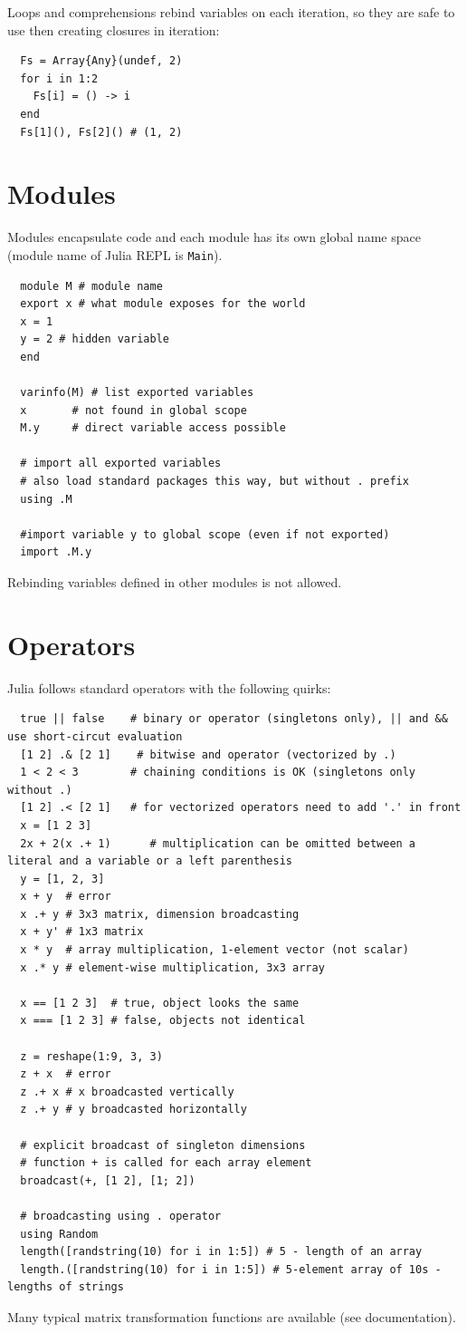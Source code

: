 \documentclass[10pt,a4paper]{article}
\begin{document}
Loops and comprehensions rebind variables on each iteration, so they are safe to use then creating closures in iteration:
\begin{lstlisting}
  Fs = Array{Any}(undef, 2)
  for i in 1:2
    Fs[i] = () -> i
  end
  Fs[1](), Fs[2]() # (1, 2)
\end{lstlisting}

\section{Modules}
Modules encapsulate code and each module has its own global name space (module name of Julia REPL is \lstinline|Main|).
\begin{lstlisting}
  module M # module name
  export x # what module exposes for the world
  x = 1
  y = 2 # hidden variable
  end

  varinfo(M) # list exported variables
  x       # not found in global scope
  M.y     # direct variable access possible

  # import all exported variables
  # also load standard packages this way, but without . prefix
  using .M

  #import variable y to global scope (even if not exported)
  import .M.y
\end{lstlisting}
Rebinding variables defined in other modules is not allowed.

\section{Operators}
Julia follows standard operators with the following quirks:
\begin{lstlisting}
  true || false    # binary or operator (singletons only), || and && use short-circut evaluation
  [1 2] .& [2 1]    # bitwise and operator (vectorized by .)
  1 < 2 < 3        # chaining conditions is OK (singletons only without .)
  [1 2] .< [2 1]   # for vectorized operators need to add '.' in front
  x = [1 2 3]
  2x + 2(x .+ 1)      # multiplication can be omitted between a literal and a variable or a left parenthesis
  y = [1, 2, 3]
  x + y  # error
  x .+ y # 3x3 matrix, dimension broadcasting
  x + y' # 1x3 matrix
  x * y  # array multiplication, 1-element vector (not scalar)
  x .* y # element-wise multiplication, 3x3 array

  x == [1 2 3]  # true, object looks the same
  x === [1 2 3] # false, objects not identical

  z = reshape(1:9, 3, 3)
  z + x  # error
  z .+ x # x broadcasted vertically
  z .+ y # y broadcasted horizontally

  # explicit broadcast of singleton dimensions
  # function + is called for each array element
  broadcast(+, [1 2], [1; 2])

  # broadcasting using . operator
  using Random
  length([randstring(10) for i in 1:5]) # 5 - length of an array
  length.([randstring(10) for i in 1:5]) # 5-element array of 10s - lengths of strings
\end{lstlisting}
Many typical matrix transformation functions are available (see documentation).
\end{document}
